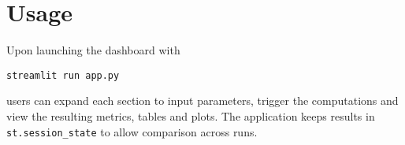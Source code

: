 \documentclass{article}
\begin{document}
\section{Usage}
Upon launching the dashboard with
\begin{verbatim}
streamlit run app.py
\end{verbatim}
users can expand each section to input parameters, trigger the computations and view the resulting metrics, tables and plots. The application keeps results in \texttt{st.session\_state} to allow comparison across runs.
\end{document}
